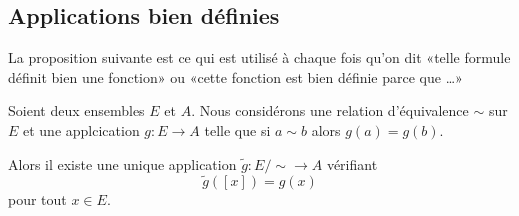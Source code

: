 \subsection{Applications bien définies}

La proposition suivante est ce qui est utilisé à chaque fois qu'on dit «telle formule définit bien une fonction» ou «cette fonction est bien définie parce que \ldots»

\begin{proposition}	\label{PROPooCONJooTpJwBe}
	Soient deux ensembles \( E\) et \( A\). Nous considérons une relation d'équivalence \( \sim\) sur \( E\) et une applcication \(g \colon E\to A  \) telle que si \( a\sim b\) alors \( g(a)=g(b)\).

	Alors il existe une unique application \(\tilde g  \colon E/\sim\to A  \) vérifiant
	\begin{equation}	\label{EQooCTHKooTXPfyh}
		\tilde g([x])=g(x)
	\end{equation}
	pour tout \( x\in E\).
\end{proposition}

